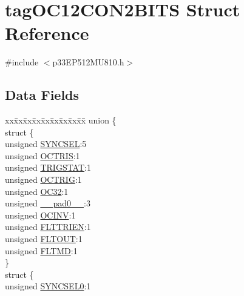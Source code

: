 \hypertarget{structtag_o_c12_c_o_n2_b_i_t_s}{}\section{tag\+O\+C12\+C\+O\+N2\+B\+I\+TS Struct Reference}
\label{structtag_o_c12_c_o_n2_b_i_t_s}


{\ttfamily \#include $<$p33\+E\+P512\+M\+U810.\+h$>$}

\subsection*{Data Fields}
\begin{DoxyCompactItemize}
\item 
\begin{tabbing}
xx\=xx\=xx\=xx\=xx\=xx\=xx\=xx\=xx\=\kill
union \{\\
\>struct \{\\
\>\>unsigned \hyperlink{structtag_o_c12_c_o_n2_b_i_t_s_a35fbbe11485c2615ed27535b62c3fa35}{SYNCSEL}:5\\
\>\>unsigned \hyperlink{structtag_o_c12_c_o_n2_b_i_t_s_ab849a74c6179282ed6b06cc047c80544}{OCTRIS}:1\\
\>\>unsigned \hyperlink{structtag_o_c12_c_o_n2_b_i_t_s_ab379549de54ac93ad4aa73686c34cb7c}{TRIGSTAT}:1\\
\>\>unsigned \hyperlink{structtag_o_c12_c_o_n2_b_i_t_s_a8d2cf9b996ef2b9079defa8950de798c}{OCTRIG}:1\\
\>\>unsigned \hyperlink{structtag_o_c12_c_o_n2_b_i_t_s_af52e127483a703e0fa84c7d4f1de0df4}{OC32}:1\\
\>\>unsigned \hyperlink{structtag_o_c12_c_o_n2_b_i_t_s_adf71f3d8410c1f1dbbc96680a92c49af}{\_\_pad0\_\_}:3\\
\>\>unsigned \hyperlink{structtag_o_c12_c_o_n2_b_i_t_s_a301004fca40c8d19d418866c92c19a06}{OCINV}:1\\
\>\>unsigned \hyperlink{structtag_o_c12_c_o_n2_b_i_t_s_ab979b75e02643aa840fb6ee50e0c30fa}{FLTTRIEN}:1\\
\>\>unsigned \hyperlink{structtag_o_c12_c_o_n2_b_i_t_s_ae466664b094d9c830e9ce20b86d7907f}{FLTOUT}:1\\
\>\>unsigned \hyperlink{structtag_o_c12_c_o_n2_b_i_t_s_a245ca3019d6c6ccbfb09f1c821146bb5}{FLTMD}:1\\
\>\} \\
\>struct \{\\
\>\>unsigned \hyperlink{structtag_o_c12_c_o_n2_b_i_t_s_a3b5df3154fde5141e6ac0156425ff8b4}{SYNCSEL0}:1\\

\end{tabbing}
\end{DoxyCompactItemize}

